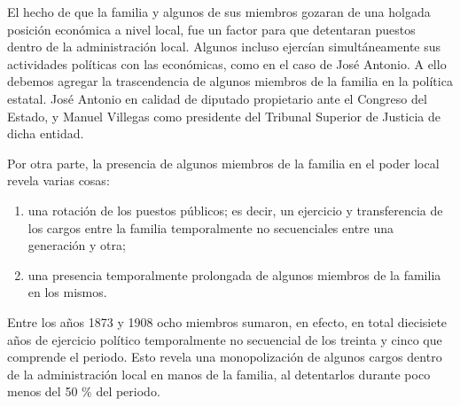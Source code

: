 \documentclass[14pt,twoside,final]{extbook} %
\begin{document}
El hecho de que la familia y algunos de sus miembros gozaran de una holgada posición económica a nivel local, fue un factor para que detentaran puestos dentro de la administración local. Algunos incluso ejercían simultáneamente sus actividades políticas con las económicas, como en el caso de José Antonio. A ello debemos agregar la trascendencia de algunos miembros de la familia en la política estatal. José Antonio en calidad de diputado propietario ante el Congreso del Estado, y Manuel Villegas como presidente del Tribunal Superior de Justicia de dicha entidad.

Por otra parte, la presencia de algunos miembros de la familia en el poder local revela varias cosas:
\begin{enumerate}[noitemsep]
\item una rotación de los puestos públicos; es decir, un ejercicio y transferencia de los cargos entre la familia temporalmente no secuenciales entre una generación y otra; 
\item una presencia temporalmente prolongada de algunos miembros de la familia en los mismos.
\end{enumerate}
Entre los años 1873 y 1908 ocho miembros sumaron, en efecto, en total diecisiete años de ejercicio político temporalmente no secuencial de los treinta y cinco que comprende el periodo. Esto revela una monopolización de algunos cargos dentro de la administración local en manos de la familia, al detentarlos durante poco menos del 50 \% del periodo.
\end{document}
